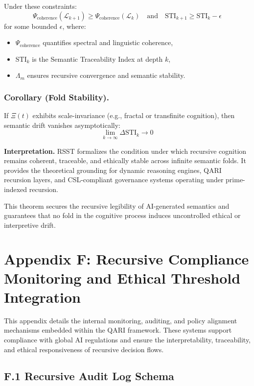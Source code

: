\documentclass[12pt]{article}
\begin{document}
\begin{itemize}
Under these constraints:
\[
\Psi_{\text{coherence}}(\mathcal{L}_{k+1}) \geq \Psi_{\text{coherence}}(\mathcal{L}_k)
\quad \text{and} \quad \text{STI}_{k+1} \geq \text{STI}_k - \epsilon
\]
for some bounded \(\epsilon\), where:
\begin{itemize}
  \item \(\Psi_{\text{coherence}}\) quantifies spectral and linguistic coherence,
  \item \(\text{STI}_k\) is the Semantic Traceability Index at depth \(k\),
  \item \(\Lambda_m\) ensures recursive convergence and semantic stability.
\end{itemize}

\subsubsection{Corollary (Fold Stability).} If \(\Xi(t)\) exhibits scale-invariance (e.g., fractal or transfinite cognition), then semantic drift vanishes asymptotically:
\[
\lim_{k \to \infty} \Delta \text{STI}_k \to 0
\]

\textbf{Interpretation.} RSST formalizes the condition under which recursive cognition remains coherent, traceable, and ethically stable across infinite semantic folds. It provides the theoretical grounding for dynamic reasoning engines, QARI recursion layers, and CSL-compliant governance systems operating under prime-indexed recursion.

This theorem secures the recursive legibility of AI-generated semantics and guarantees that no fold in the cognitive process induces uncontrolled ethical or interpretive drift.
\section*{Appendix F: Recursive Compliance Monitoring and Ethical Threshold Integration}

This appendix details the internal monitoring, auditing, and policy alignment mechanisms embedded within the QARI framework. These systems support compliance with global AI regulations and ensure the interpretability, traceability, and ethical responsiveness of recursive decision flows.

\subsection*{F.1 Recursive Audit Log Schema}


\end{itemize}
\end{document}
